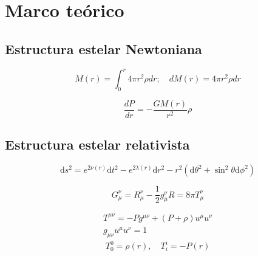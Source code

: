 \chapter{Marco teórico}

\section{Estructura estelar Newtoniana}
\begin{equation}
    M ( r ) = \int _ { 0 } ^ { r } 4 \pi r ^ { 2 } \rho d r ; \quad d M ( r ) = 4 \pi r ^ { 2 } \rho d r
\end{equation}

\begin{equation}
    \frac { d P } { d r } = - \frac { G M ( r ) } { r ^ { 2 } } \rho
\end{equation}

\section{Estructura estelar relativista}

\begin{equation}
\mathrm { d } s ^ { 2 } = e ^ { 2 \nu ( r ) } \mathrm { d } t ^ { 2 } - e ^ { 2 \lambda ( r ) } \mathrm { d } r ^ { 2 } - r ^ { 2 } \left( \mathrm { d } \theta ^ { 2 } + \sin ^ { 2 }  \theta  \mathrm { d } \phi ^ { 2 } \right)    
\end{equation}

\begin{equation}
    G _ { \mu } ^ { \nu } = R _ { \mu } ^ { \nu } - \frac { 1 } { 2 } g _ { \mu } ^ { \nu } R = 8 \pi T _ { \mu } ^ { \nu }
\end{equation}

\begin{equation}
    \begin{array} { c } { T ^ { \mu \nu } = - P g ^ { \mu \nu } + ( P + \rho ) u ^ { \mu } u ^ { \nu } } \\ { g _ { \mu \nu } u ^ { \mu } u ^ { \nu } = 1 } \end{array}
\end{equation}
\begin{equation}
    T _ { 0 } ^ { 0 } = \rho(r) , \quad T _ { i } ^ { i } = - P(r)
\end{equation}

